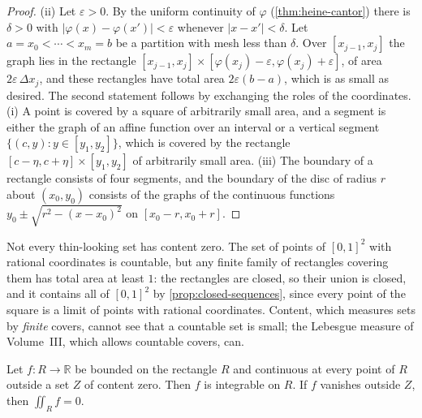 \begin{proof}
(ii) Let $\varepsilon>0$. By the uniform continuity of $\varphi$ (\cref{thm:heine-cantor}) there is $\delta>0$ with $|\varphi(x)-\varphi(x')|<\varepsilon$ whenever $|x-x'|<\delta$. Let $a=x_0<\cdots<x_m=b$ be a partition with mesh less than $\delta$. Over $[x_{j-1},x_j]$ the graph lies in the rectangle $[x_{j-1},x_j]\times[\varphi(x_j)-\varepsilon,\varphi(x_j)+\varepsilon]$, of area $2\varepsilon\,\Delta x_j$, and these rectangles have total area $2\varepsilon(b-a)$, which is as small as desired. The second statement follows by exchanging the roles of the coordinates. (i) A point is covered by a square of arbitrarily small area, and a segment is either the graph of an affine function over an interval or a vertical segment $\{(c,y): y\in[y_1,y_2]\}$, which is covered by the rectangle $[c-\eta,c+\eta]\times[y_1,y_2]$ of arbitrarily small area. (iii) The boundary of a rectangle consists of four segments, and the boundary of the disc of radius $r$ about $(x_0,y_0)$ consists of the graphs of the continuous functions $y_0\pm\sqrt{r^2-(x-x_0)^2}$ on $[x_0-r,x_0+r]$.
\end{proof}

Not every thin-looking set has content zero. The set of points of $[0,1]^2$ with rational coordinates is countable, but any finite family of rectangles covering them has total area at least $1$: the rectangles are closed, so their union is closed, and it contains all of $[0,1]^2$ by \cref{prop:closed-sequences}, since every point of the square is a limit of points with rational coordinates. Content, which measures sets by \emph{finite} covers, cannot see that a countable set is small; the Lebesgue measure of Volume~III, which allows countable covers, can.

\begin{theorem}
\label{thm:integrable-content-zero}
Let $f\colon R\to\mathbb R$ be bounded on the rectangle $R$ and continuous at every point of $R$ outside a set $Z$ of content zero. Then $f$ is integrable on $R$. If $f$ vanishes outside $Z$, then $\iint_Rf=0$.
\end{theorem}

